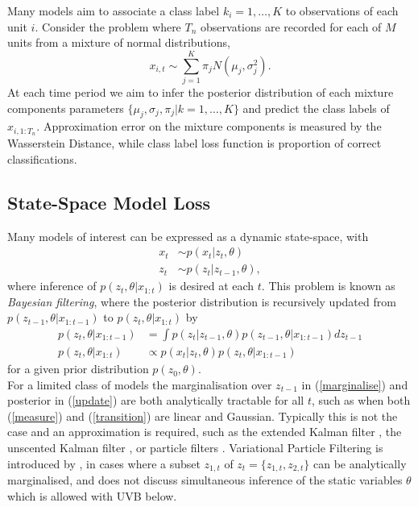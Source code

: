\documentclass[12pt,a4paper]{article}\usepackage[]{graphicx}\usepackage[]{color}
\begin{document}
Many models aim to associate a class label $k_i = 1 , \dots, K$ to observations of each unit $i$. Consider the problem where $T_n$ observations are recorded for each of $M$ units from a mixture of normal distributions,
\begin{equation}
\label{mixNormalDGP}
x_{i, t} \sim \sum_{j=1}^K \pi_{j} N(\mu_j, \sigma^2_{j}).
\end{equation}
At each time period we aim to infer the posterior distribution of each mixture components parameters $\{\mu_j, \sigma_j, \pi_j | k = 1, \dots, K\}$ and predict the class labels of $x_{i, 1:T_n}$. Approximation error on the mixture components is measured by the Wasserstein Distance, while class label loss function is proportion of correct classifications.

\subsection{State-Space Model Loss}

Many models of interest can be expressed as a dynamic state-space, with
\begin{align}
x_t &\sim p(x_t | z_{t}, \theta) \label{measure} \\
z_t &\sim p(z_t | z_{t-1}, \theta) \label{transition} ,
\end{align}
where inference of $p(z_t, \theta | x_{1:t})$ is desired at each $t$. This problem is known as \textit{Bayesian filtering}, where the posterior distribution is recursively updated from $p(z_{t-1}, \theta | x_{1:t-1})$ to $p(z_t, \theta | x_{1:t})$ by
\begin{align}
p(z_t, \theta | x_{1:t-1}) &= \int p(z_t | z_{t-1}, \theta) p(z_{t-1}, \theta | x_{1:t-1})dz_{t-1} \label{marginalise} \\
p(z_t, \theta | x_{1:t}) &\propto p(x_t | z_t, \theta) p(z_t, \theta | x_{1:t-1}) \label{update}
\end{align}
for a given prior distribution $p(z_0, \theta)$. 
\\

For a limited class of models the marginalisation over $z_{t-1}$ in (\ref{marginalise}) and posterior in (\ref{update}) are both analytically tractable for all $t$, such as when both (\ref{measure}) and (\ref{transition}) are linear and Gaussian. Typically this is not the case and an approximation is required, such as the extended Kalman filter \citep{Anderson1979}, the unscented Kalman filter \citep{Wan2000}, or particle filters \citet{Arulampalam2002}. Variational Particle Filtering is introduced by \citet{Smidl2008}, in cases where a subset $z_{1, t}$ of $z_t = \{z_{1, t}, z_{2, t}\}$ can be analytically marginalised, and does not discuss simultaneous inference of the static variables $\theta$ which is allowed with UVB below.
\\
\end{document}
